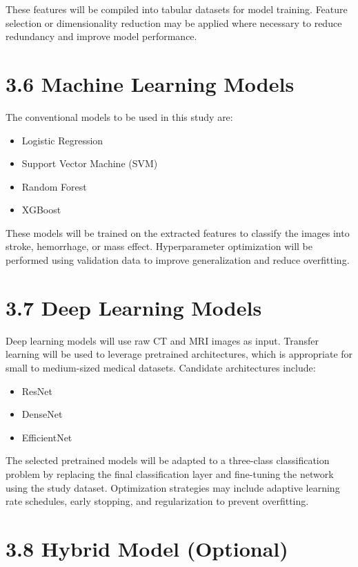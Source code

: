 \documentclass[12pt,a4paper]{report}
\begin{document}
These features will be compiled into tabular datasets for model training. Feature selection or dimensionality reduction may be applied where necessary to reduce redundancy and improve model performance.

\section{3.6 Machine Learning Models}

The conventional models to be used in this study are:

\begin{itemize}
\item Logistic Regression
\item Support Vector Machine (SVM)
\item Random Forest
\item XGBoost
\end{itemize}

These models will be trained on the extracted features to classify the images into stroke, hemorrhage, or mass effect. Hyperparameter optimization will be performed using validation data to improve generalization and reduce overfitting.

\section{3.7 Deep Learning Models}

Deep learning models will use raw CT and MRI images as input. Transfer learning will be used to leverage pretrained architectures, which is appropriate for small to medium-sized medical datasets. Candidate architectures include:

\begin{itemize}
\item ResNet
\item DenseNet
\item EfficientNet
\end{itemize}

The selected pretrained models will be adapted to a three-class classification problem by replacing the final classification layer and fine-tuning the network using the study dataset. Optimization strategies may include adaptive learning rate schedules, early stopping, and regularization to prevent overfitting.

\section{3.8 Hybrid Model (Optional)}
\end{document}
